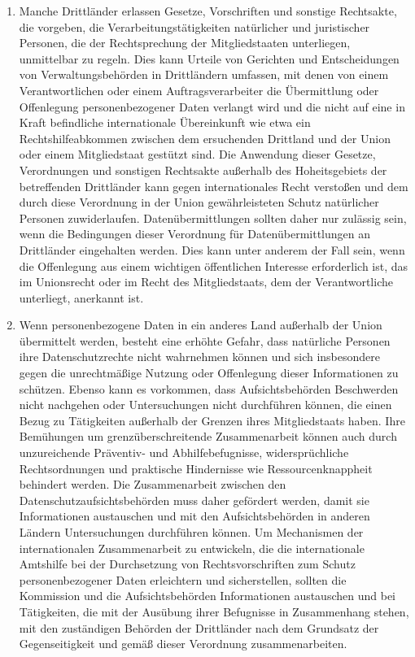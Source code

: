 \begin{enumerate}
   \item Manche Drittländer erlassen Gesetze, Vorschriften und sonstige Rechtsakte, die vorgeben, die
    Verarbeitungstätigkeiten natürlicher und juristischer Personen, die der Rechtsprechung der Mitgliedstaaten
    unterliegen, unmittelbar zu regeln. Dies kann Urteile von Gerichten und Entscheidungen von Verwaltungsbehörden in
    Drittländern umfassen, mit denen von einem Verantwortlichen oder einem Auftragsverarbeiter die Übermittlung oder
    Offenlegung personenbezogener Daten verlangt wird und die nicht auf eine in Kraft befindliche internationale
    Übereinkunft wie etwa ein Rechtshilfeabkommen zwischen dem ersuchenden Drittland und der Union oder einem
    Mitgliedstaat gestützt sind. Die Anwendung dieser Gesetze, Verordnungen und sonstigen Rechtsakte außerhalb des
    Hoheitsgebiets der betreffenden Drittländer kann gegen internationales Recht verstoßen und dem durch diese
    Verordnung in der Union gewährleisteten Schutz natürlicher Personen zuwiderlaufen. Datenübermittlungen sollten
    daher nur zulässig sein, wenn die Bedingungen dieser Verordnung für Datenübermittlungen an Drittländer eingehalten
    werden. Dies kann unter anderem der Fall sein, wenn die Offenlegung aus einem wichtigen öffentlichen Interesse
    erforderlich ist, das im Unionsrecht oder im Recht des Mitgliedstaats, dem der Verantwortliche unterliegt,
    anerkannt ist.%
   \label{eg:115}
   

   \item Wenn personenbezogene Daten in ein anderes Land außerhalb der Union übermittelt werden, besteht eine erhöhte
    Gefahr, dass natürliche Personen ihre Datenschutzrechte nicht wahrnehmen können und sich insbesondere gegen die
    unrechtmäßige Nutzung oder Offenlegung dieser Informationen zu schützen. Ebenso kann es vorkommen, dass
    Aufsichtsbehörden Beschwerden nicht nachgehen oder Untersuchungen nicht durchführen können, die einen Bezug zu
    Tätigkeiten außerhalb der Grenzen ihres Mitgliedstaats haben. Ihre Bemühungen um grenzüberschreitende
    Zusammenarbeit können auch durch unzureichende Präventiv- und Abhilfebefugnisse, widersprüchliche Rechtsordnungen
    und praktische Hindernisse wie Ressourcenknappheit behindert werden. Die Zusammenarbeit zwischen den
    Datenschutzaufsichtsbehörden muss daher gefördert werden, damit sie Informationen austauschen und mit den
    Aufsichtsbehörden in anderen Ländern Untersuchungen durchführen können. Um Mechanismen der internationalen
    Zusammenarbeit zu entwickeln, die die internationale Amtshilfe bei der Durchsetzung von Rechtsvorschriften zum
    Schutz personenbezogener Daten erleichtern und sicherstellen, sollten die Kommission und die Aufsichtsbehörden
    Informationen austauschen und bei Tätigkeiten, die mit der Ausübung ihrer Befugnisse in Zusammenhang stehen, mit
    den zuständigen Behörden der Drittländer nach dem Grundsatz der Gegenseitigkeit und gemäß dieser Verordnung
    zusammenarbeiten.%
   \label{eg:116}
   

\end{enumerate}
